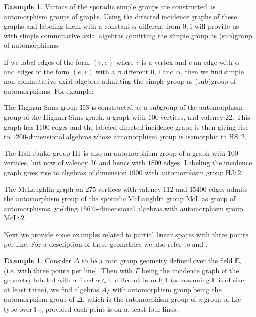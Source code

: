 \documentclass[oneside,a4paper]{amsart} %
\theoremstyle{definition}
\newtheorem{example}[proposition]{Example}
\begin{document}
\begin{example}
Various of the sporadic simple groups are constructed as automorphism groups of graphs.
Using the directed  incidence graphs of these graphs and labeling them with a constant $\alpha$ different from $0,1$ will provide us with
simple commutative  axial algebras admitting the simple group as (sub)group of automorphisms.

If we label edges of the form $(v,e)$ where $v$ is a vertex and $e$ an edge with $\alpha$ and edges of the form $(e,v)$ with a $\beta$ different $0,1$ and $\alpha$,
then we find simple non-commutative  axial algebras admitting the simple group as (sub)group of automorphisms. For example:

The Higman-Sims group $\mathrm{HS}$ is constructed as a subgroup of the automorphism group of the Higman-Sims graph, a graph 
with $100$ vertices, and valency $22$. This graph has $1100$ edges and the labeled directed incidence graph is then giving rise to
$1200$-dimensional algebras whose automorphism group is isomorphic to $\mathrm{HS}:2$.

The Hall-Janko group $\mathrm{HJ}$ is also an automorphism group of a graph with $100$ vertices, but now of valency $36$ and hence with $1800$ edges.
Labeling the incidence graph gives rise to algebras of dimension $1900$ with automorphism group  $\mathrm{HJ}:2$.

The McLaughlin graph on $275$ vertices with valency $112$  and $15400$ edges admits the automorphism group of the 
sporadic McLaughlin group $\mathrm{McL}$ as group of automorphisms, yielding $15675$-dimensional algebras with automorphism group
$\mathrm{McL}:2$.
\end{example}

Next we provide some examples related to partial linear spaces with three points per line.
For a description of these geometries we also refer to \cite{drg} and \cite{BC}.
\begin{example}
Consider $\Delta$ to be a root group geometry defined over the field $\mathbb{F}_2$ (i.e. with three points per line).
Then with $\Gamma$ being the incidence graph of the geometry labeled with a fixed $\alpha\in \mathbb{F}$ different from $0,1$ (so assuming $\mathbb{F}$ is of size at least three), we find algebras $A_\Gamma$ with automorphism group 
being the automorphism group of $\Delta$, which is the automorphism group of a group of Lie type over $\mathbb{F}_2$, provided each point is on at least four lines.
\end{example}
\end{document}
